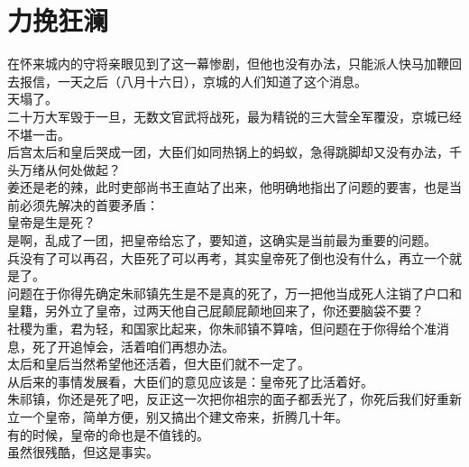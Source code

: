 \section{力挽狂澜}
\ifnum{}
	\begin{multicols}{\theparacolNo}
\fi
在怀来城内的守将亲眼见到了这一幕惨剧，但他也没有办法，只能派人快马加鞭回去报信，一天之后（八月十六日），京城的人们知道了这个消息。\\

天塌了。\\

二十万大军毁于一旦，无数文官武将战死，最为精锐的三大营全军覆没，京城已经不堪一击。\\

后宫太后和皇后哭成一团，大臣们如同热锅上的蚂蚁，急得跳脚却又没有办法，千头万绪从何处做起？\\

姜还是老的辣，此时吏部尚书王直站了出来，他明确地指出了问题的要害，也是当前必须先解决的首要矛盾：\\

皇帝是生是死？\\

是啊，乱成了一团，把皇帝给忘了，要知道，这确实是当前最为重要的问题。\\

兵没有了可以再召，大臣死了可以再考，其实皇帝死了倒也没有什么，再立一个就是了。\\

问题在于你得先确定朱祁镇先生是不是真的死了，万一把他当成死人注销了户口和皇籍，另外立了皇帝，过两天他自己屁颠屁颠地回来了，你还要脑袋不要？\\

社稷为重，君为轻，和国家比起来，你朱祁镇不算啥，但问题在于你得给个准消息，死了开追悼会，活着咱们再想办法。\\

太后和皇后当然希望他还活着，但大臣们就不一定了。\\

从后来的事情发展看，大臣们的意见应该是：皇帝死了比活着好。\\

朱祁镇，你还是死了吧，反正这一次把你祖宗的面子都丢光了，你死后我们好重新立一个皇帝，简单方便，别又搞出个建文帝来，折腾几十年。\\

有的时候，皇帝的命也是不值钱的。\\

虽然很残酷，但这是事实。\\


\end{multicols}

